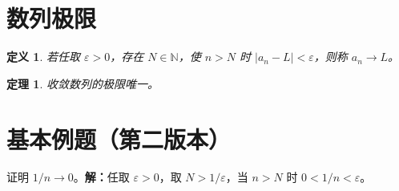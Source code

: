 \documentclass[UTF8,fontset=fandol,11pt]{ctexart}
\newtheorem{definition}{定义}[section]
\newtheorem{theorem}{定理}[section]
\begin{document}
\section{数列极限}
\begin{definition}若任取 $\varepsilon>0$，存在 $N\in\mathbb N$，使 $n>N$ 时 $|a_n-L|<\varepsilon$，则称 $a_n\to L$。\end{definition}
\begin{theorem}收敛数列的极限唯一。\end{theorem}
\section{基本例题（第二版本）}
证明 $1/n\to0$。\textbf{解：}任取 $\varepsilon>0$，取 $N>1/\varepsilon$，当 $n>N$ 时 $0<1/n<\varepsilon$。
\end{document}
